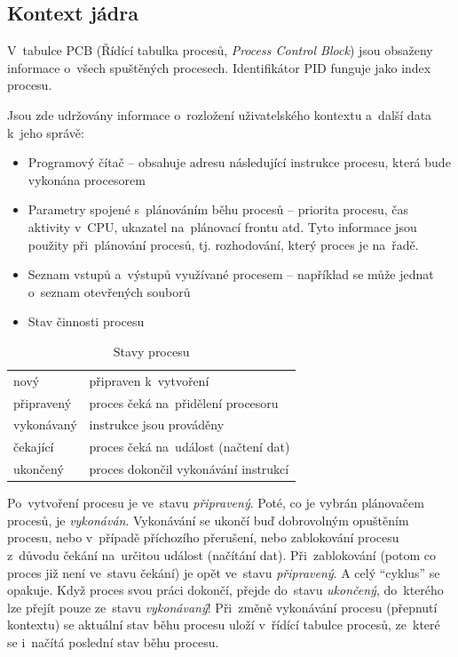\subsection{Kontext jádra}

V~tabulce PCB (Řídící tabulka procesů, \emph{Process Control Block}) jsou obsaženy informace o~všech spuštěných procesech. Identifikátor PID funguje jako index procesu.

Jsou zde udržovány informace o~rozložení uživatelského kontextu a~další data k~jeho správě:

\begin{itemize}[noitemsep]
	\item Programový čítač -- obsahuje adresu následující instrukce procesu, která bude vykonána procesorem
	\item Parametry spojené s~plánováním běhu procesů -- priorita procesu, čas aktivity v~CPU, ukazatel na~plánovací frontu atd. Tyto informace jsou použity při~plánování procesů, tj. rozhodování, který proces je na~řadě. 
	\item Seznam vstupů a~výstupů využívané procesem -- například se může jednat o~seznam otevřených souborů
	\item Stav činnosti procesu
\end{itemize}

\begin{table}[ht]
	\centering
	\begin{tabular}{l|l}
	nový       & připraven k~vytvoření \\
	připravený & proces čeká na~přidělení procesoru \\
	vykonávaný & instrukce jsou prováděny \\
	čekající   & proces čeká na~událost (načtení dat) \\
	ukončený   & proces dokončil vykonávání instrukcí \\
	\end{tabular}
	\caption{Stavy procesu}
\end{table}

Po~vytvoření procesu je ve~stavu \emph{připravený}. Poté, co je vybrán plánovačem procesů, je \emph{vykonáván}. Vykonávání se ukončí buď dobrovolným opuštěním procesu, nebo v~případě příchozího přerušení, nebo zablokování procesu z~důvodu čekání na~určitou událost (načítání dat). Při~zablokování (potom co proces již není ve~stavu čekání) je opět ve~stavu \emph{připravený}. A celý \enquote{cyklus} se opakuje. Když proces svou práci dokončí, přejde do~stavu \emph{ukončený}, do~kterého lze přejít pouze ze~stavu \emph{vykonávaný}! Při~změně vykonávání procesu (přepnutí kontextu) se aktuální stav běhu procesu uloží v~řídící tabulce procesů, ze~které se i~načítá poslední stav běhu procesu.


